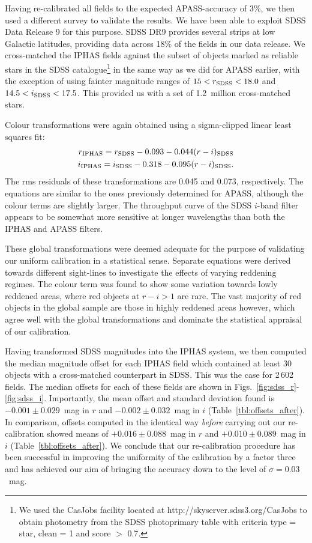 \documentclass[useAMS,usenatbib]{mn2e}
\begin{document}
Having re-calibrated all fields to the expected APASS-accuracy of 3\%,
we then used a different survey to validate the results.
We have been able to exploit SDSS Data Release 9 \citep{Ahn2012}
for this purpose.
SDSS DR9 provides several strips at low
Galactic latitudes,
providing data across 18\% of the fields in our data release.
We cross-matched the IPHAS fields against the subset of
objects marked as reliable stars in the SDSS catalogue\footnote{
We used the CasJobs facility located at http://skyserver.sdss3.org/CasJobs
to obtain photometry from the SDSS {\sc photoprimary} table 
with criteria {\sc type = star}, {\sc clean = 1} and {\sc score $>$ 0.7}.}
in the same way as we did for APASS earlier,
with the exception of using fainter magnitude ranges of 
$15<r_{\rm SDSS}<18.0$ and $14.5<i_{\rm SDSS}<17.5$.
This provided us with a set of 1.2~million cross-matched stars.

Colour transformations were again obtained using a sigma-clipped linear least squares fit:
\begin{eqnarray}
r_{\rm IPHAS} = r_{\rm SDSS} - 0.093 - 0.044(r-i)_{\rm SDSS} \label{eqn:sdss_r} \\
i_{\rm IPHAS} = i_{\rm SDSS} - 0.318 - 0.095(r-i)_{\rm SDSS}. \label{eqn:sdss_i}
\end{eqnarray}
The rms residuals of these transformations are 0.045 and 0.073, respectively.
The equations are similar to the ones
previously determined for APASS,
although the colour terms are slightly larger.
The throughput curve of the SDSS $i$-band filter 
appears to be somewhat more sensitive at longer wavelengths
than both the IPHAS and APASS filters.

These global transformations were deemed adequate
for the purpose of validating our uniform calibration in a statistical sense.
Separate equations were derived towards different sight-lines
to investigate the effects of varying reddening regimes.
The colour term was found 
to show some variation towards lowly reddened areas,
where red objects at $r-i > 1$ are rare.
The vast majority of red objects in the global sample
are those in highly reddened areas however,
which agree well with the global transformations
and dominate the statistical appraisal of our calibration.

Having transformed SDSS magnitudes into the IPHAS system,
we then computed the median magnitude offset for each IPHAS field
which contained at least 30 objects with a cross-matched counterpart
in SDSS.
This was the case for 2\,602 fields.
The median offsets for each of these fields
are shown in Figs.~\ref{fig:sdss_r}-\ref{fig:sdss_i}.
Importantly, the mean offset and standard deviation found 
is $-0.001\pm0.029$~mag in $r$
and $-0.002\pm0.032$~mag in $i$ (Table~\ref{tbl:offsets_after}).
In comparison, offsets computed in the identical way
\emph{before} carrying out our re-calibration showed means
of $+0.016\pm0.088$~mag in $r$ and $+0.010\pm0.089$~mag in $i$ (Table~\ref{tbl:offsets_after}).
We conclude that our re-calibration procedure has
been successful in improving the
uniformity of the calibration by a factor three
and has achieved our aim of bringing the
accuracy down to the level of $\sigma=0.03$~mag.
\end{document}
